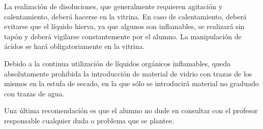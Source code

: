 \documentclass{tufte-handout}
\begin{document}
La realización de disoluciones, que generalmente requieren agitación y calentamiento, deberá
hacerse en la vitrina. En caso de calentamiento, deberá evitarse que el líquido hierva, ya que
algunos son inflamables, se realizará sin tapón y deberá vigilarse constantemente por el
alumno.
La manipulación de ácidos se hará obligatoriamente en la vitrina.

Debido a la continua utilización de líquidos orgánicos inflamables, queda absolutamente
prohibida la introducción de material de vidrio con trazas de los mismos en la estufa de
secado, en la que sólo se introducirá material no graduado con trazas de agua.

Una última recomendación es que el alumno no dude en consultar con el profesor responsable cualquier duda o problema que se plantee.
\end{document}
